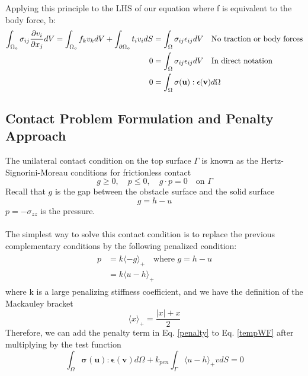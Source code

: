 \documentclass[12pt,3p]{article}
\begin{document}
Applying this principle to the LHS of our equation where f is equivalent to the body force, b:
\begin{align}\label{tempWF}
\begin{split}
\int_{\Omega_o} \sigma_{ij} \pdv{v_i}{x_j}  dV = \int_{\Omega_o} f_k v_k dV + \int_{\partial \Omega_o} t_i v_i dS &= \int_{\Omega} \sigma_{ij}  \epsilon_{ij} dV \quad \text{No traction or body forces} \\
0 &= \int_{\Omega} \sigma_{ij}  \epsilon_{ij} dV \quad \text{In direct notation}\\
0 &= \int_{\Omega} \mathbf{ \sigma(u) : \epsilon(v) } d \Omega 
 \end{split}
\end{align}

\subsection{Contact Problem Formulation and Penalty Approach}
The unilateral contact condition on the top surface $\Gamma$ is known as the Hertz-Signorini-Moreau conditions for frictionless contact 
\begin{equation}
g \geq 0, \quad p \leq 0, \quad g \cdot p = 0 \quad \text{on } \Gamma
\end{equation}
Recall that $g$ is the gap between the obstacle surface and the solid surface
\begin{equation*}
g = h - u
\end{equation*}
 $p = - \sigma_{zz}$ is the pressure. \\ \\
The simplest way to solve this contact condition is to replace the previous complementary conditions by the following penalized condition:
\begin{align}\label{penalty}
\begin{split}
p &= k\langle-g \rangle_{+} \quad \text{where } g = h - u \\
	&= k \langle u-h \rangle_{+}
\end{split}
\end{align}
where k is a large penalizing stiffness coefficient, and we have the definition of the Mackauley bracket
\begin{equation}\label{ppos}
\langle x \rangle_{+} = \frac{|x| + x}{2} 
\end{equation}
Therefore, we can add the penalty term in Eq. \ref{penalty} to Eq. \ref{tempWF} after multiplying by the test function 
\begin{equation*}
\int_{\Omega} \mathbf{ \sigma(u) : \epsilon(v) } d \Omega + k_{pen} \int_{\Gamma} \langle u - h \rangle_{+} v dS  = 0 
\end{equation*}
\end{document}
